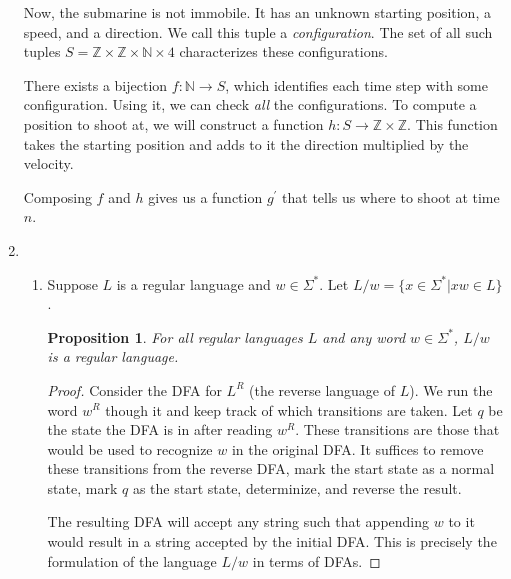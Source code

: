 \documentclass[letterpaper,11pt]{article}
\newtheorem{proposition}{Proposition}
\newcommand{\Z}{\mathbb{Z}}
\newcommand{\N}{\mathbb{N}}
\begin{document}
\begin{enumerate}
        Now, the submarine is not immobile. It has an unknown starting
        position, a speed, and a direction. We call this tuple a
        \emph{configuration}. The set of all such tuples
        $S = \Z \times \Z \times \N \times 4$ characterizes these
        configurations.

        There exists a bijection $f : \N \to S$, which identifies each time
        step with some configuration. Using it, we can check \emph{all} the
        configurations. To compute a position to shoot at, we will construct a
        function $h : S \to \Z \times \Z$. This function takes the starting
        position and adds to it the direction multiplied by the velocity.

        Composing $f$ and $h$ gives us a function $g^\prime$ that tells us
        where to shoot at time $n$.

    \item
        \begin{enumerate}
            \item
                Suppose $L$ is a regular language and $w \in \Sigma^*$. Let
                $L/w = \{x \in \Sigma^* | xw \in L\}$.

                \begin{proposition}
                    For all regular languages $L$ and any word $w \in
                    \Sigma^*$, $L/w$ is a regular language.
                \end{proposition}

                \begin{proof}
                    Consider the DFA for $L^R$ (the reverse language of $L$).
                    We run the word $w^R$ though it and keep track of which
                    transitions are taken. Let $q$ be the state the DFA is in
                    after reading $w^R$.  These transitions are those that
                    would be used to recognize $w$ in the original DFA. It
                    suffices to remove these transitions from the reverse DFA,
                    mark the start state as a normal state, mark $q$ as the
                    start state, determinize, and reverse the result.

                    The resulting DFA will accept any string such that
                    appending $w$ to it would result in a string accepted by
                    the initial DFA.  This is precisely the formulation of the
                    language $L/w$ in terms of DFAs.


\end{proof}
\end{enumerate}
\end{enumerate}
\end{document}
